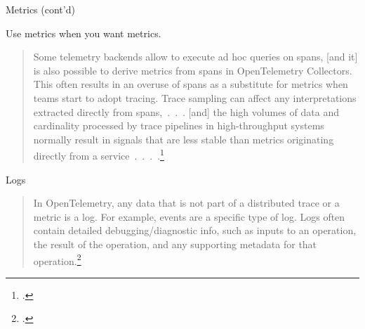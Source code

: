 \documentclass[aspectratio=169]{beamer}
\begin{document}
\begin{frame}{Metrics (cont'd)}

  Use metrics when you want metrics.

  \vspace{1em}

  \begin{quote}

    Some telemetry backends allow to execute ad hoc queries on spans, [and it]
    is also possible to derive metrics from spans in OpenTelemetry Collectors.
      {\Large This often results in an overuse of spans as a substitute for
        metrics when teams start to adopt tracing.} Trace sampling can affect any
    interpretations extracted directly from spans,~.~.~. [and] the high volumes
    of data and cardinality processed by trace pipelines in high-throughput
    systems normally result in signals that are less stable than metrics
    originating directly from a service~.~.~.~.\footcite[ch.~6, emphasis
      added]{practical-otel}

  \end{quote}
\end{frame}

\begin{frame}{Logs}
  \begin{quote}

    In OpenTelemetry, any data that is not part of a distributed trace or a
    metric is a log. For example, events are a specific type of log. Logs often
    contain detailed debugging/diagnostic info, such as inputs to an operation,
    the result of the operation, and any supporting metadata for that
    operation.\footcite{otel-logs}

  \end{quote}
\end{frame}
\end{document}
